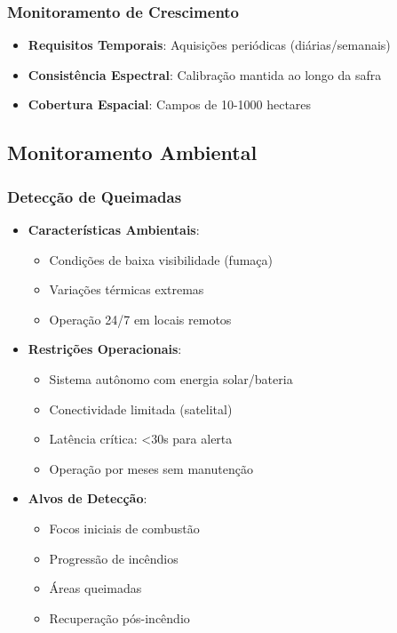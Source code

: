 \subsubsection{Monitoramento de Crescimento}
\begin{itemize}
    \item \textbf{Requisitos Temporais}: Aquisições periódicas (diárias/semanais)
    \item \textbf{Consistência Espectral}: Calibração mantida ao longo da safra
    \item \textbf{Cobertura Espacial}: Campos de 10-1000 hectares
\end{itemize}

\subsection{Monitoramento Ambiental}

\subsubsection{Detecção de Queimadas}
\begin{itemize}
    \item \textbf{Características Ambientais}:
    \begin{itemize}
        \item Condições de baixa visibilidade (fumaça)
        \item Variações térmicas extremas
        \item Operação 24/7 em locais remotos
    \end{itemize}
    
    \item \textbf{Restrições Operacionais}:
    \begin{itemize}
        \item Sistema autônomo com energia solar/bateria
        \item Conectividade limitada (satelital)
        \item Latência crítica: <30s para alerta
        \item Operação por meses sem manutenção
    \end{itemize}
    
    \item \textbf{Alvos de Detecção}:
    \begin{itemize}
        \item Focos iniciais de combustão
        \item Progressão de incêndios
        \item Áreas queimadas
        \item Recuperação pós-incêndio
    \end{itemize}
\end{itemize}

